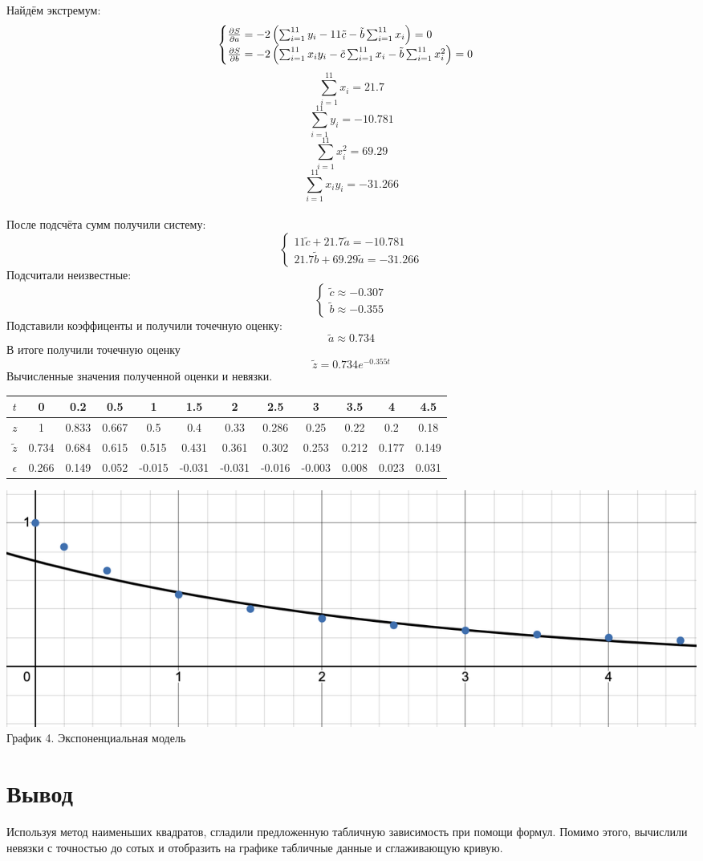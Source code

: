 \documentclass{article}
\begin{document}
Найдём экстремум:
\[\begin{cases}
    \pdv{S}{a} = -2\left(\sum_{i=1}^{11}y_i - 11\tilde{c} - \tilde{b}\sum_{i=1}^{11}x_i\right) = 0\\
    \pdv{S}{b} = -2\left(\sum_{i=1}^{11}x_iy_i - \tilde{c}\sum_{i=1}^{11}x_i - \tilde{b}\sum_{i=1}^{11}x_i^2\right) = 0
\end{cases}\]
\[\sum_{i=1}^{11}x_i = 21.7\]
\[\sum_{i=1}^{11}y_i = -10.781\]
\[\sum_{i=1}^{11}x_i^2 = 69.29\]
\[\sum_{i=1}^{11}x_iy_i = -31.266\]
\\
После подсчёта сумм получили систему:
\[\begin{cases}
    11\tilde{c} + 21.7\tilde{a} = -10.781\\
    21.7\tilde{b} + 69.29\tilde{a} = -31.266
\end{cases}\]
Подсчитали неизвестные:
\[\begin{cases}
    \tilde{c}  \approx -0.307\\
    \tilde{b}  \approx -0.355
\end{cases}\]
Подставили коэффиценты и получили точечную оценку:
\[\tilde{a} \approx 0.734\]
В итоге получили точечную оценку
\[\tilde{z} = 0.734e^{-0.355t}\]
Вычисленные значения полученной оценки и невязки.
\begin{table}[H]
    \centering
    \begin{tabular}{|c|*{11}{c|}}
        \hline
        \(t\)&0 & 0.2 & 0.5 & 1 & 1.5 & 2 & 2.5 & 3 & 3.5 & 4 & 4.5 \\
        \hline
        \(z\)&1 &0.833&0.667 & 0.5& 0.4& 0.33& 0.286& 0.25& 0.22& 0.2& 0.18 \\
        \hline
        \(\tilde{z}\) & 0.734 & 0.684 & 0.615 & 0.515 & 0.431& 0.361& 0.302 & 0.253 & 0.212 & 0.177 & 0.149 \\
        \hline
        \(\epsilon\) & 0.266 & 0.149 & 0.052 & -0.015 & -0.031& -0.031 & -0.016 & -0.003 & 0.008 & 0.023& 0.031  \\
        \hline
    \end{tabular}
\end{table}
\begin{center}
    \includegraphics[width=.9\textwidth]{exp.png}\\
    График 4. Экспоненциальная модель
\end{center}

\section*{Вывод}

Используя метод наименьших квадратов, сгладили
предложенную табличную зависимость при помощи формул. 
Помимо этого, вычислили невязки с точностью до сотых и отобразить на графике табличные данные и сглаживающую кривую. 
\end{document}
